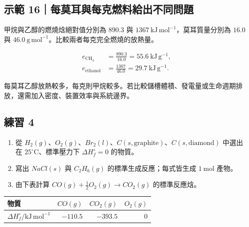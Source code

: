 \documentclass[11pt,a4paper]{article}
\newcounter{none}
\providecommand{\tightlist}{%
  \setlength{\itemsep}{0pt}\setlength{\parskip}{0pt}}
\begin{document}
\begin{HandoutWorkedExample}

\subsection{示範 16｜每莫耳與每克燃料給出不同問題}\label{ux793aux7bc4-16ux6bcfux83abux8033ux8207ux6bcfux514bux71c3ux6599ux7d66ux51faux4e0dux540cux554fux984c}

甲烷與乙醇的燃燒焓絕對值分別為 \(890.3\) 與 \(1367\ \mathrm{kJ\,mol^{-1}}\)，莫耳質量分別為 \(16.0\) 與 \(46.0\ \mathrm{g\,mol^{-1}}\)。比較兩者每克完全燃燒的放熱量。

\[
\begin{aligned}
e_{\mathrm{CH_4}}&=\frac{890.3}{16.0}=55.6\ \mathrm{kJ\,g^{-1}},\\
e_{\mathrm{ethanol}}&=\frac{1367}{46.0}=29.7\ \mathrm{kJ\,g^{-1}}.
\end{aligned}
\]

每莫耳乙醇放熱較多，每克則甲烷較多。若比較儲槽體積、發電量或生命週期排放，還需加入密度、裝置效率與系統邊界。

\end{HandoutWorkedExample}

\subsection{練習 4}\label{ux7df4ux7fd2-4}

\begin{enumerate}
\def\labelenumi{\arabic{enumi}.}
\tightlist
\item
  從 \(H_2(g)\)、\(O_2(g)\)、\(Br_2(l)\)、\(C(s,\mathrm{graphite})\)、\(C(s,\mathrm{diamond})\) 中選出在 \(25^\circ\mathrm C\)、標準壓力下 \(\Delta H_f^\circ=0\) 的物質。
\item
  寫出 \(NaCl(s)\) 與 \(C_2H_6(g)\) 的標準生成反應；每式皆生成 \(1\ \mathrm{mol}\) 產物。
\item
  由下表計算 \(CO(g)+\frac12O_2(g)\rightarrow CO_2(g)\) 的標準反應焓。
\end{enumerate}

{\def\LTcaptype{none} %
\begin{longtable}[]{@{}lrrr@{}}
\toprule\noalign{}
物質 & \(CO(g)\) & \(CO_2(g)\) & \(O_2(g)\) \\
\midrule\noalign{}
\endhead
\bottomrule\noalign{}
\endlastfoot
\(\Delta H_f^\circ/\mathrm{kJ\,mol^{-1}}\) & \(-110.5\) & \(-393.5\) & \(0\) \\
\end{longtable}
}
\end{document}
